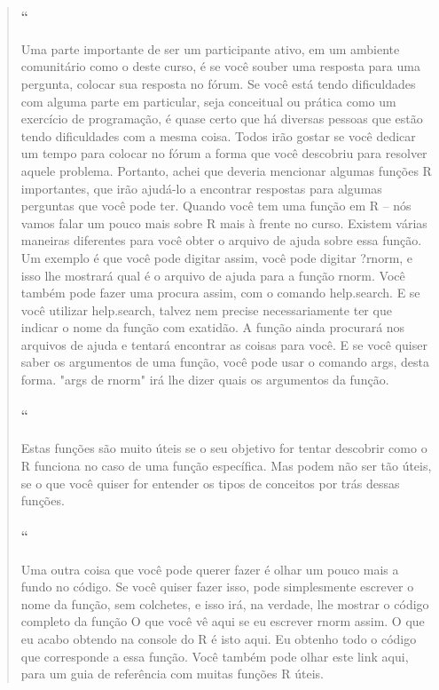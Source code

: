 \begin{quotation}
\begin{small}
\paragraph{``}
Uma parte importante de ser um participante ativo, em um ambiente comunitário como o deste curso, é se você souber uma resposta para uma pergunta, colocar sua resposta no fórum. Se você está tendo dificuldades com alguma parte em particular,  seja conceitual ou prática como um exercício de programação, é quase certo que há diversas pessoas que estão tendo dificuldades com a mesma coisa. Todos irão gostar se você dedicar um tempo para colocar no fórum a forma que você descobriu para resolver aquele problema. Portanto, achei que deveria mencionar algumas funções R importantes,  que irão ajudá-lo a encontrar respostas para algumas perguntas que você pode ter. Quando você tem uma função em R –  nós vamos falar um pouco mais sobre R mais à frente no curso. Existem várias maneiras diferentes para você obter o arquivo de ajuda sobre essa função. Um exemplo é que você pode digitar assim, você pode digitar ?rnorm, e isso lhe mostrará qual é o arquivo de ajuda para a função rnorm. Você também pode fazer uma procura assim, com o comando help.search. E se você utilizar help.search, talvez nem precise necessariamente ter que indicar o nome da função com exatidão. A função ainda procurará nos arquivos de ajuda e tentará encontrar as coisas para você. E se você quiser saber os argumentos de uma função, você pode usar o comando args, desta forma. "args de rnorm" irá lhe dizer quais os argumentos da função.

\paragraph{``}
Estas funções são muito úteis se o seu objetivo for tentar descobrir como o R funciona no caso de uma função específica. Mas podem não ser tão úteis, se o que você quiser for entender os tipos de conceitos por trás dessas funções.

\paragraph{``}
Uma outra coisa que você pode querer fazer  é olhar um pouco mais a fundo no código. Se você quiser fazer isso, pode simplesmente escrever o nome da função, sem colchetes, e isso irá, na verdade, lhe mostrar o código completo da função O que você vê aqui se eu escrever rnorm assim. O que eu acabo obtendo na console do R é isto aqui. Eu obtenho todo o código que corresponde a essa função. Você também pode olhar este link aqui, para um guia de referência com muitas funções R úteis.


\end{small}
\end{quotation}
